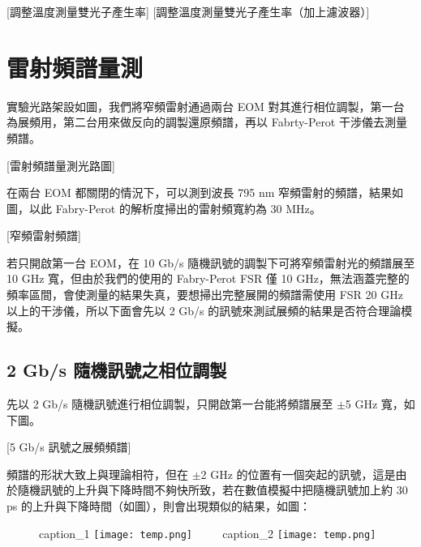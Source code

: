 \documentclass[class=NCU_thesis, crop=false]{standalone}
\begin{document}
[調整溫度測量雙光子產生率]
[調整溫度測量雙光子產生率（加上濾波器）]

\section{雷射頻譜量測}

實驗光路架設如圖，我們將窄頻雷射通過兩台 EOM 對其進行相位調製，第一台為展頻用，第二台用來做反向的調製還原頻譜，再以 Fabrty-Perot 干涉儀去測量頻譜。

[雷射頻譜量測光路圖]

在兩台 EOM 都關閉的情況下，可以測到波長 795 nm 窄頻雷射的頻譜，結果如圖，以此 Fabry-Perot 的解析度掃出的雷射頻寬約為 30 MHz。

[窄頻雷射頻譜]

若只開啟第一台 EOM，在 10 Gb/s 隨機訊號的調製下可將窄頻雷射光的頻譜展至 10 GHz 寬，但由於我們的使用的 Fabry-Perot FSR 僅 10 GHz，無法涵蓋完整的頻率區間，會使測量的結果失真，要想掃出完整展開的頻譜需使用 FSR 20 GHz 以上的干涉儀，所以下面會先以 2 Gb/s 的訊號來測試展頻的結果是否符合理論模擬。

\subsection{2 Gb/s 隨機訊號之相位調製}
先以 2 Gb/s 隨機訊號進行相位調製，只開啟第一台能將頻譜展至 $\pm$5 GHz 寬，如下圖。

[5 Gb/s 訊號之展頻頻譜]

頻譜的形狀大致上與理論相符，但在 $\pm$2 GHz 的位置有一個突起的訊號，這是由於隨機訊號的上升與下降時間不夠快所致，若在數值模擬中把隨機訊號加上約 30 ps 的上升與下降時間（如圖），則會出現類似的結果，如圖：

\begin{figure}[!hbt]
    \centering
    \subcaptionbox
        {caption\_1
        \label{fig:subfig_fig1}}
        {\texttt{[image: temp.png]}}
    ~~~~
    \subcaptionbox
        {caption\_2
        \label{fig:subfig_fig2}}
        {\texttt{[image: temp.png]}}
\end{figure}

\end{document}
